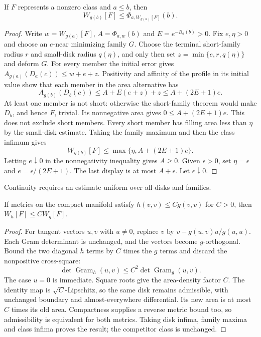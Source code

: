 \begin{proposition}
\label{prop:v4-endpoint-comparison}
If $F$ represents a nonzero class and $a\leq b$, then
\[
 W_{g(b)}[F]\leq\Phi_{a,W_{g(a)}[F]}(b).
\]
\end{proposition}
\begin{proof}
Write $w=W_{g(a)}[F]$, $A=\Phi_{a,w}(b)$ and $E=e^{-B_a(b)}>0$.
Fix $e,\eta>0$ and choose an $e$-near minimizing family $G$.
Choose the terminal short-family radius $r$ and small-disk radius
$q(\eta)$, and only then set $z=\min\{e,r,q(\eta)\}$ and deform $G$.
For every member the initial error gives
$A_{g(a)}(D_a(c))\leq w+e+z$. Positivity and affinity of the profile
in its initial value show that each member in the area alternative has
\[
 A_{g(b)}(D_b(c))\leq A+E(e+z)+z\leq A+(2E+1)e.
\]
At least one member is not short: otherwise the short-family theorem
would make $D_b$, and hence $F$, trivial. Its nonnegative area gives
$0\leq A+(2E+1)e$. This does not exclude short members.
Every short member has filling area less than $\eta$ by the small-disk
estimate. Taking the family maximum and then the class infimum gives
\[
 W_{g(b)}[F]\leq\max\{\eta,A+(2E+1)e\}.
\]
Letting $e\downarrow0$ in the nonnegativity inequality gives $A\geq0$.
Given $\epsilon>0$, set $\eta=\epsilon$ and $e=\epsilon/(2E+1)$.
The last display is at most $A+\epsilon$. Let $\epsilon\downarrow0$.
\end{proof}

Continuity requires an estimate uniform over all disks and families.

\begin{lemma}
\label{lem:v4-metric-width}
If metrics on the compact manifold satisfy $h(v,v)\leq Cg(v,v)$
for $C>0$, then $W_h[F]\leq CW_g[F]$.
\end{lemma}
\begin{proof}
For tangent vectors $u,v$ with $u\ne0$, replace $v$ by
$v-g(u,v)u/g(u,u)$. Each Gram determinant is unchanged, and the
vectors become $g$-orthogonal. Bound the two diagonal $h$ terms by
$C$ times the $g$ terms and discard the nonpositive cross-square:
\[
 \det\operatorname{Gram}_h(u,v)
 \leq C^2\det\operatorname{Gram}_g(u,v).
\]
The case $u=0$ is immediate. Square roots give the area-density factor
$C$. The identity map is $\sqrt C$-Lipschitz, so the same disk remains
admissible, with unchanged boundary and almost-everywhere differential.
Its new area is at most $C$ times its old area. Compactness supplies a
reverse metric bound too, so admissibility is equivalent for both metrics.
Taking disk infima, family maxima and class infima proves the result;
the competitor class is unchanged.
\end{proof}

